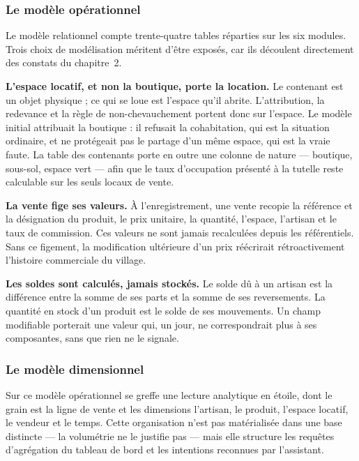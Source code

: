 \subsubsection{Le modèle opérationnel}

Le modèle relationnel compte trente-quatre tables réparties sur les six modules. Trois choix de modélisation méritent d'être exposés, car ils découlent directement des constats du chapitre~2.

\textbf{L'espace locatif, et non la boutique, porte la location.} Le contenant est un objet physique ; ce qui se loue est l'espace qu'il abrite. L'attribution, la redevance et la règle de non-chevauchement portent donc sur l'espace. Le modèle initial attribuait la boutique : il refusait la cohabitation, qui est la situation ordinaire, et ne protégeait pas le partage d'un même espace, qui est la vraie faute. La table des contenants porte en outre une colonne de nature --- boutique, sous-sol, espace vert --- afin que le taux d'occupation présenté à la tutelle reste calculable sur les seuls locaux de vente.

\textbf{La vente fige ses valeurs.} À l'enregistrement, une vente recopie la référence et la désignation du produit, le prix unitaire, la quantité, l'espace, l'artisan et le taux de commission. Ces valeurs ne sont jamais recalculées depuis les référentiels. Sans ce figement, la modification ultérieure d'un prix réécrirait rétroactivement l'histoire commerciale du village.

\textbf{Les soldes sont calculés, jamais stockés.} Le solde dû à un artisan est la différence entre la somme de ses parts et la somme de ses reversements. La quantité en stock d'un produit est le solde de ses mouvements. Un champ modifiable porterait une valeur qui, un jour, ne correspondrait plus à ses composantes, sans que rien ne le signale.

\subsubsection{Le modèle dimensionnel}

Sur ce modèle opérationnel se greffe une lecture analytique en étoile, dont le grain est la ligne de vente et les dimensions l'artisan, le produit, l'espace locatif, le vendeur et le temps. Cette organisation n'est pas matérialisée dans une base distincte --- la volumétrie ne le justifie pas --- mais elle structure les requêtes d'agrégation du tableau de bord et les intentions reconnues par l'assistant.

